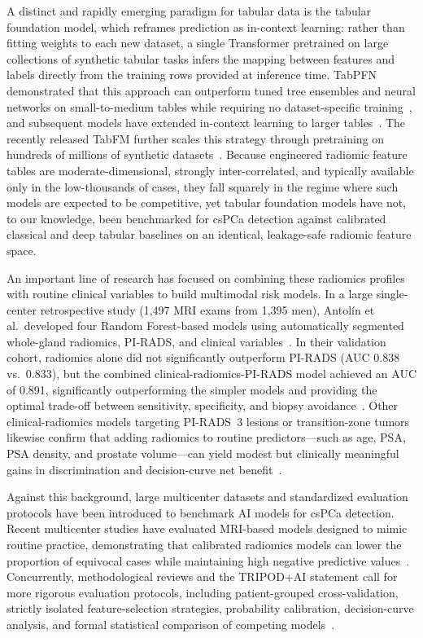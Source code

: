 \documentclass[11pt]{article}
\begin{document}
A distinct and rapidly emerging paradigm for tabular data is the tabular foundation model, which reframes prediction as in-context learning: rather than fitting weights to each new dataset, a single Transformer pretrained on large collections of synthetic tabular tasks infers the mapping between features and labels directly from the training rows provided at inference time. TabPFN demonstrated that this approach can outperform tuned tree ensembles and neural networks on small-to-medium tables while requiring no dataset-specific training~\citep{hollmann2025tabpfn}, and subsequent models have extended in-context learning to larger tables~\citep{qu2025tabicl}. The recently released TabFM further scales this strategy through pretraining on hundreds of millions of synthetic datasets~\citep{kong2026tabfm}. Because engineered radiomic feature tables are moderate-dimensional, strongly inter-correlated, and typically available only in the low-thousands of cases, they fall squarely in the regime where such models are expected to be competitive, yet tabular foundation models have not, to our knowledge, been benchmarked for csPCa detection against calibrated classical and deep tabular baselines on an identical, leakage-safe radiomic feature space.

An important line of research has focused on combining these radiomics profiles with routine clinical variables to build multimodal risk models. In a large single-center retrospective study (1{,}497 MRI exams from 1{,}395 men), Antol{\'i}n et al.\ developed four Random Forest-based models using automatically segmented whole-gland radiomics, PI-RADS, and clinical variables~\citep{Antolin2026Insights}. In their validation cohort, radiomics alone did not significantly outperform PI-RADS (AUC 0.838 vs.\ 0.833), but the combined clinical-radiomics-PI-RADS model achieved an AUC of 0.891, significantly outperforming the simpler models and providing the optimal trade-off between sensitivity, specificity, and biopsy avoidance~\citep{Antolin2026Insights}. Other clinical-radiomics models targeting PI-RADS~3 lesions or transition-zone tumors likewise confirm that adding radiomics to routine predictors—such as age, PSA, PSA density, and prostate volume—can yield modest but clinically meaningful gains in discrimination and decision-curve net benefit~\citep{BMC2025PIRADS3,FrontOnc2026TZRadiomics}.

Against this background, large multicenter datasets and standardized evaluation protocols have been introduced to benchmark AI models for csPCa detection. Recent multicenter studies have evaluated MRI-based models designed to mimic routine practice, demonstrating that calibrated radiomics models can lower the proportion of equivocal cases while maintaining high negative predictive values~\citep{Bao2024,JZUSciB2023MRIRadiomics}. Concurrently, methodological reviews and the TRIPOD+AI statement call for more rigorous evaluation protocols, including patient-grouped cross-validation, strictly isolated feature-selection strategies, probability calibration, decision-curve analysis, and formal statistical comparison of competing models~\citep{collins2024tripodai}.
\end{document}
